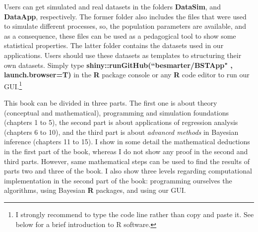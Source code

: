 Users can get simulated and real datasets in the folders \textbf{DataSim}, and \textbf{DataApp}, respectively. The former folder also includes the files that were used to simulate different processes, so, the population parameters are available, and as a consequence, these files can be used as a pedagogical tool to show some statistical properties. The latter folder contains the datasets used in our applications. Users should use these datasets as templates to structuring their own datasets. Simply type \textbf{shiny::runGitHub(``besmarter/BSTApp" , launch.browser=T)} in the \textbf{R} package console or any \textbf{R} code editor to run our GUI.\footnote{I strongly recommend to type the code line rather than copy and paste it. See below for a brief introduction to R software.}

This book can be divided in three parts. The first one is about theory (conceptual and mathematical), programming and simulation foundations (chapters 1 to 5), the second part is about applications of regression analysis (chapters 6 to 10), and the third part is about \textit{advanced methods} in Bayesian inference (chapters 11 to 15). I show in some detail the mathematical deductions in the first part of the book, whereas I do not show any proof in the second and third parts. However, same mathematical steps can be used to find the results of parts two and three of the book. I also show three levels regarding computational implementation in the second part of the book: programming ourselves the algorithms, using Bayesian \textbf{R} packages, and using our GUI. 

